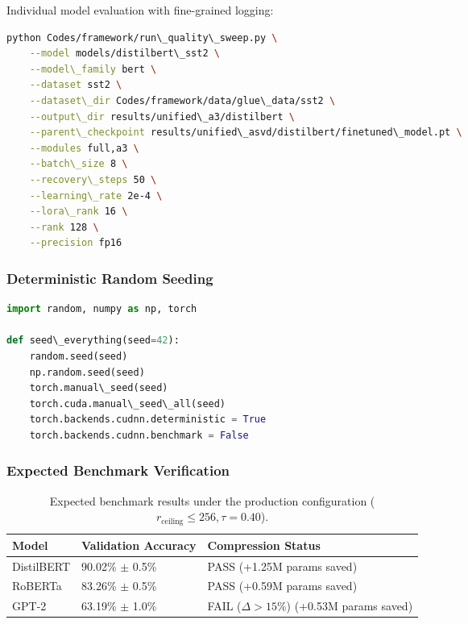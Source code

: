 Individual model evaluation with fine-grained logging:

\begin{lstlisting}[language=bash]
python Codes/framework/run\_quality\_sweep.py \
    --model models/distilbert\_sst2 \
    --model\_family bert \
    --dataset sst2 \
    --dataset\_dir Codes/framework/data/glue\_data/sst2 \
    --output\_dir results/unified\_a3/distilbert \
    --parent\_checkpoint results/unified\_asvd/distilbert/finetuned\_model.pt \
    --modules full,a3 \
    --batch\_size 8 \
    --recovery\_steps 50 \
    --learning\_rate 2e-4 \
    --lora\_rank 16 \
    --rank 128 \
    --precision fp16
\end{lstlisting}

\subsubsection{Deterministic Random Seeding}

\begin{lstlisting}[language=python]
import random, numpy as np, torch

def seed\_everything(seed=42):
    random.seed(seed)
    np.random.seed(seed)
    torch.manual\_seed(seed)
    torch.cuda.manual\_seed\_all(seed)
    torch.backends.cudnn.deterministic = True
    torch.backends.cudnn.benchmark = False
\end{lstlisting}

\subsubsection{Expected Benchmark Verification}

\begin{table}[H]
\centering
\small
\begin{tabular}{lll}
\toprule
\textbf{Model} & \textbf{Validation Accuracy} & \textbf{Compression Status} \\
\midrule
DistilBERT & 90.02\% $\pm$ 0.5\% & PASS (+1.25M params saved) \\
RoBERTa    & 83.26\% $\pm$ 0.5\% & PASS (+0.59M params saved) \\
GPT-2      & 63.19\% $\pm$ 1.0\% & FAIL ($\Delta > 15\%$) (+0.53M params saved) \\
\bottomrule
\end{tabular}
\caption{Expected benchmark results under the production configuration ($r_{\mathrm{ceiling}} \le 256, \tau=0.40$).}
\label{tab:app_repro_expected}
\end{table}